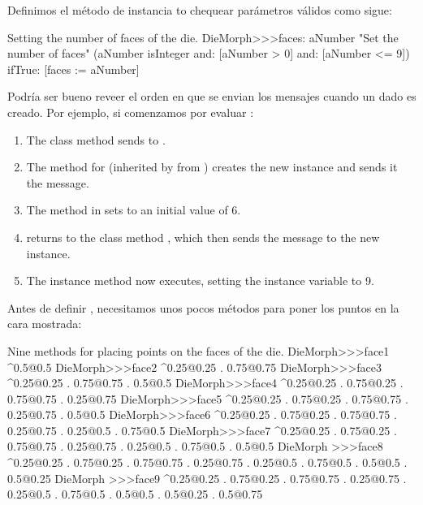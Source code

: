 \documentclass[a4paper,10pt,twoside]{book}
\begin{document}
Definimos el m\'etodo de instancia  to chequear par\'ametros v\'alidos como sigue:

\begin{method}{Setting the number of faces of the die.}
DieMorph>>>faces: aNumber
	"Set the number of faces"
	(aNumber isInteger
			and: [aNumber > 0]
			and: [aNumber <= 9])
		ifTrue: [faces := aNumber]
\end{method}

Podr\'ia ser bueno reveer el orden en que se envian los mensajes cuando un dado es creado. Por ejemplo, si comenzamos por
evaluar :
\begin{enumerate}
	\item The class method  sends  to .
	\item The method for  (inherited by  from ) creates the new instance and sends it the  message.
	\item The  method in  sets  to an initial value of 6.
	\item {} returns to the class method , which then sends the message  to the new instance.
	\item The instance method  now executes, setting the  instance variable to 9.
\end{enumerate}

Antes de definir , necesitamos unos pocos m\'etodos para poner los puntos en la cara mostrada:
\begin{methods}{Nine methods for placing points on the faces of the die.}
DieMorph>>>face1
	^{0.5@0.5}
DieMorph>>>face2
	^{0.25@0.25 . 0.75@0.75}
DieMorph>>>face3
	^{0.25@0.25 . 0.75@0.75 . 0.5@0.5}
DieMorph>>>face4
	^{0.25@0.25 . 0.75@0.25 . 0.75@0.75 . 0.25@0.75}
DieMorph>>>face5
	^{0.25@0.25 . 0.75@0.25 . 0.75@0.75 . 0.25@0.75 . 0.5@0.5}
DieMorph>>>face6
	^{0.25@0.25 . 0.75@0.25 . 0.75@0.75 . 0.25@0.75 . 0.25@0.5 . 0.75@0.5}
DieMorph>>>face7
	^{0.25@0.25 . 0.75@0.25 . 0.75@0.75 . 0.25@0.75 . 0.25@0.5 . 0.75@0.5 . 0.5@0.5}
DieMorph >>>face8
	^{0.25@0.25 . 0.75@0.25 . 0.75@0.75 . 0.25@0.75 . 0.25@0.5 . 0.75@0.5 . 0.5@0.5 . 0.5@0.25}
DieMorph >>>face9
	^{0.25@0.25 . 0.75@0.25 . 0.75@0.75 . 0.25@0.75 . 0.25@0.5 . 0.75@0.5 . 0.5@0.5 . 0.5@0.25 . 0.5@0.75}
\end{methods}
\end{document}
